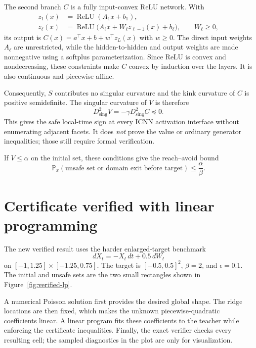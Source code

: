 \documentclass[10pt]{extarticle}
\begin{document}
The second branch $C$ is a fully input-convex ReLU network.  With
\begin{align}
  z_1(x)&=\operatorname{ReLU}(A_1x+b_1),\\
  z_{\ell}(x)&=\operatorname{ReLU}
  \bigl(A_{\ell}x+W_{\ell}z_{\ell-1}(x)+b_{\ell}\bigr),
  \qquad W_{\ell}\geq0,
\end{align}
its output is $C(x)=a^\top x+b+w^\top z_L(x)$ with $w\geq0$.  The direct
input weights $A_\ell$ are unrestricted, while the hidden-to-hidden and output
weights are made nonnegative using a softplus parameterization.  Since ReLU is
convex and nondecreasing, these constraints make $C$ convex by induction over
the layers.  It is also continuous and piecewise affine.

Consequently, $S$ contributes no singular curvature and the kink curvature of
$C$ is positive semidefinite.  The singular curvature of $V$ is therefore
\begin{equation}
  D^2_{\mathrm{sing}}V=-\gamma D^2_{\mathrm{sing}}C\preceq0.
\end{equation}
This gives the safe local-time sign at every ICNN activation interface without
enumerating adjacent facets.  It does \emph{not} prove the value or ordinary
generator inequalities; those still require formal verification.

If $V\leq\alpha$ on the initial set, these conditions give the reach--avoid
bound
\begin{equation}
  \mathbb P_x(\text{unsafe set or domain exit before target})
  \leq \frac{\alpha}{\beta}.
\end{equation}

\section{Certificate verified with linear programming}

The new verified result uses the harder enlarged-target benchmark
\begin{equation}
  dX_t=-X_t\,dt+0.5\,dW_t
\end{equation}
on $[-1,1.25]\times[-1.25,0.75]$.  The target is $[-0.5,0.5]^2$,
$\beta=2$, and $\epsilon=0.1$.  The initial and unsafe sets are the two small
rectangles shown in Figure~\ref{fig:verified-lp}.

A numerical Poisson solution first provides the desired global shape.  The
ridge locations are then fixed, which makes the unknown piecewise-quadratic
coefficients linear.  A linear program fits these coefficients to the teacher
while enforcing the certificate inequalities.  Finally, the exact verifier
checks every resulting cell; the sampled diagnostics in the plot are only for
visualization.
\end{document}
